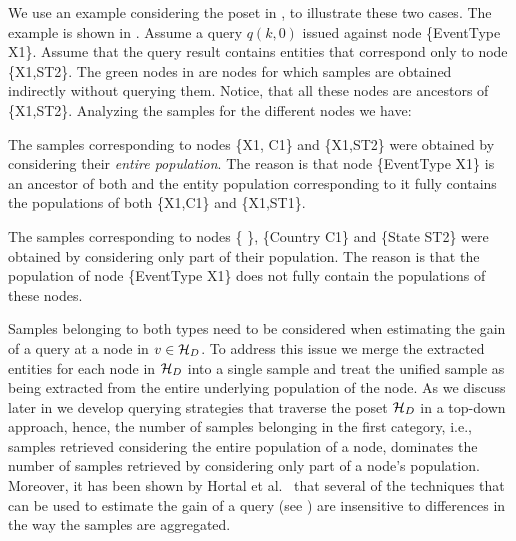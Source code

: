 We use an example considering the poset in , to illustrate these two cases. The example is shown in . Assume a query $q(k,0)$ issued against node \{EventType X1\}. Assume that the query result contains entities that correspond only to node \{X1,ST2\}. The green nodes in  are nodes for which samples are obtained indirectly without querying them. Notice, that all these nodes are ancestors of \{X1,ST2\}. Analyzing the samples for the different nodes we have:
\squishlist
\item The samples corresponding to nodes \{X1, C1\} and \{X1,ST2\} were obtained by considering their {\em entire population}. The reason is that node \{EventType X1\} is an ancestor of both and the entity population corresponding to it fully contains the populations of both \{X1,C1\} and \{X1,ST1\}. 
\item The samples corresponding to nodes \{ \}, \{Country C1\} and \{State ST2\} were obtained by considering only part of their population. The reason is that the population of node \{EventType X1\} does not fully contain the populations of these nodes. 
\squishend

Samples belonging to both types need to be considered when estimating the gain of a query at a node in $v \in \mathcal{H}_D$. To address this issue we merge the extracted entities for each node in $\mathcal{H}_D$ into a single sample and treat the unified sample as being extracted from the entire underlying population of the node. As we discuss later in  we develop querying strategies that traverse the poset $\mathcal{H}_D$ in a top-down approach, hence, the number of samples belonging in the first category, i.e., samples retrieved considering the entire population of a node, dominates the number of samples retrieved by considering only part of a node's population. Moreover, it has been shown by Hortal et al.~\cite{hortal2006evaluating} that several of the techniques that can be used to estimate the gain of a query (see ) are insensitive to differences in the way the samples are aggregated.
\fi
